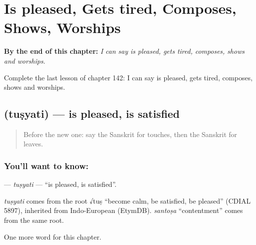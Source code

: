 
\chapter{Is pleased, Gets tired, Composes, Shows, Worships}
\label{ch:sa-is-pleased-gets-tired-composes-shows-worships}

\begin{chapteropening}
\textbf{By the end of this chapter:} \emph{I can say is pleased, gets tired, composes, shows and worships.}

Complete the last lesson of chapter 142: I can say is pleased, gets tired, composes, shows and worships.
\end{chapteropening}

\section[\texorpdfstring{\sk{तुष्यति} (tuṣyati)}{तुष्यति (tuṣyati)}]{ (tuṣyati) — is pleased, is satisfied}

\label{lesson:SA-C142-tusyati}



\begin{quote}
Before the new one: say the Sanskrit for touches, then the Sanskrit for leaves.
\end{quote}

\subsection*{You'll want to know: }
\textbf{} — \emph{tuṣyati} — \textquotedblleft{}is pleased, is satisfied\textquotedblright{}.

\begin{cousinweb}
\emph{tuṣyati} comes from the root √tuṣ \textquotedblleft{}become calm, be satisfied, be pleased\textquotedblright{} (CDIAL 5897), inherited from Indo-European (EtymDB). \emph{santoṣa} \textquotedblleft{}contentment\textquotedblright{} comes from the same root.
\end{cousinweb}

\begin{grammarlens}[title={What you've built}]
One more word for this chapter.
\end{grammarlens}

